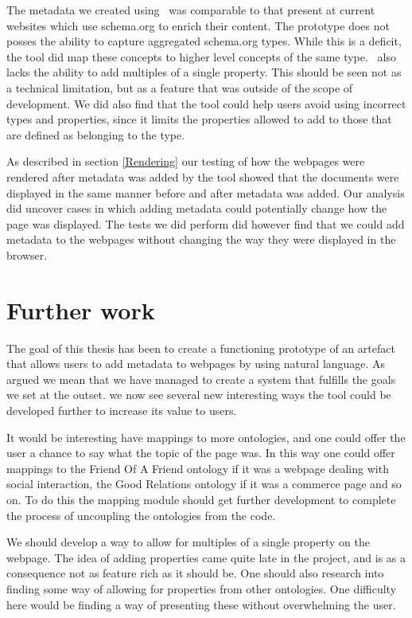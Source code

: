 The metadata we created using \theartefact\ was comparable to that present at current websites which use schema.org to
enrich their content.
The prototype does not posses the ability to capture aggregated schema.org types.
While this is a deficit, the tool did map these concepts to higher level concepts of the same type.
\Theartefact\ also lacks the ability to add multiples of a single property.
This should be seen not as a technical limitation, but as a feature that was outside of the scope of development.
We did also find that the tool could help users avoid using incorrect types and properties,
since it limits the properties allowed to add to those that are defined as belonging to the type.

As described in section \ref{Rendering} our testing of how the webpages were rendered after metadata was added by the tool
showed that the documents were displayed in the same manner before and after metadata was added.
Our analysis did uncover cases in which adding metadata could potentially change how the page was displayed.
The tests we did perform did however find that we could add metadata to the webpages without changing the way they were displayed in the browser.


\section{Further work}
The goal of this thesis has been to create a functioning prototype of an artefact that allows users to add metadata
to webpages by using natural language.
As argued we mean that we have managed to create a system that fulfills the goals we set at the outset.
we now see several new interesting ways the tool could be developed further to increase its value to users.

It would be interesting have mappings to more ontologies,
and one could offer the user a chance to say what the topic of the page was.
In this way one could offer mappings to the Friend Of A Friend ontology if it was a webpage dealing with
social interaction, the Good Relations ontology if it was a commerce page and so on.
To do this the mapping module should get further development to complete the process of uncoupling the ontologies
from the code.

We should develop a way to allow for multiples of a single property on the webpage.
The idea of adding properties came quite late in the project,
and is as a consequence not as feature rich as it should be.
One should also research into finding some way of allowing for properties from other ontologies.
One difficulty here would be finding a way of presenting these without overwhelming the user.

